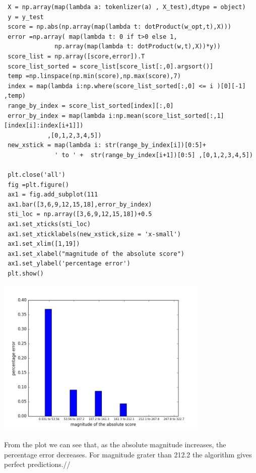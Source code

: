 \documentclass{article}
\newenvironment{problem}[2][$\bullet$]{\begin{trivlist}\large
		\item[\hskip \labelsep {\bfseries #1}\hskip \labelsep {\bfseries #2.}]}  {\end{trivlist}}
\begin{document}
\begin{problem}{6.7}
\end{problem}
\begin{verbatim}
 X = np.array(map(lambda a: tokenlizer(a) , X_test),dtype = object)
 y = y_test
 score = np.abs(np.array(map(lambda t: dotProduct(w_opt,t),X)))
 error =np.array( map(lambda t: 0 if t>0 else 1,
			  np.array(map(lambda t: dotProduct(w,t),X))*y))
 score_list = np.array([score,error]).T
 score_list_sorted = score_list[score_list[:,0].argsort()]
 temp =np.linspace(np.min(score),np.max(score),7)
 index = map(lambda i:np.where(score_list_sorted[:,0] <= i )[0][-1] ,temp)
 range_by_index = score_list_sorted[index][:,0]
 error_by_index = map(lambda i:np.mean(score_list_sorted[:,1][index[i]:index[i+1]])
			,[0,1,2,3,4,5])
 new_xstick = map(lambda i: str(range_by_index[i])[0:5]+
			  ' to ' +  str(range_by_index[i+1])[0:5] ,[0,1,2,3,4,5])
 
 plt.close('all')
 fig =plt.figure()
 ax1 = fig.add_subplot(111
 ax1.bar([3,6,9,12,15,18],error_by_index)
 sti_loc = np.array([3,6,9,12,15,18])+0.5
 ax1.set_xticks(sti_loc)
 ax1.set_xticklabels(new_xstick,size = 'x-small')
 ax1.set_xlim([1,19])
 ax1.set_xlabel("magnitude of the absolute score")
 ax1.set_ylabel('percentage error')
 plt.show()
 \end{verbatim}
\begin{center}
	\includegraphics[width = 4in]{6_7.png}
\end{center}

From the plot we can see that, as the absolute magnitude increases, the percentage error decreases. For magnitude grater than  212.2 the algorithm gives perfect predictions.//

\pagebreak

\begin{problem}{6.8}
\end{problem}
\end{document}
